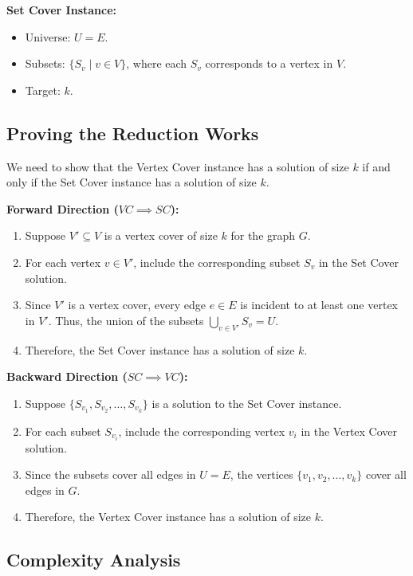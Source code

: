 \documentclass[10pt,letter,notitlepage]{article}
\begin{document}
\begin{Answer}
\textbf{Set Cover Instance:}
\begin{itemize}
    \item Universe: \(U = E\).
    \item Subsets: \(\{S_v \mid v \in V\}\), where each \(S_v\) corresponds to a vertex in \(V\).
    \item Target: \(k\).
\end{itemize}

\subsection*{Proving the Reduction Works}

We need to show that the Vertex Cover instance has a solution of size \(k\) if and only if the Set Cover instance has a solution of size \(k\).

\textbf{Forward Direction (\(VC \implies SC\)):}
\begin{enumerate}
    \item Suppose \(V' \subseteq V\) is a vertex cover of size \(k\) for the graph \(G\).
    \item For each vertex \(v \in V'\), include the corresponding subset \(S_v\) in the Set Cover solution.
    \item Since \(V'\) is a vertex cover, every edge \(e \in E\) is incident to at least one vertex in \(V'\). Thus, the union of the subsets \(\bigcup_{v \in V'} S_v = U\).
    \item Therefore, the Set Cover instance has a solution of size \(k\).
\end{enumerate}

\textbf{Backward Direction (\(SC \implies VC\)):}
\begin{enumerate}
    \item Suppose \(\{S_{v_1}, S_{v_2}, \dots, S_{v_k}\}\) is a solution to the Set Cover instance.
    \item For each subset \(S_{v_i}\), include the corresponding vertex \(v_i\) in the Vertex Cover solution.
    \item Since the subsets cover all edges in \(U = E\), the vertices \(\{v_1, v_2, \dots, v_k\}\) cover all edges in \(G\).
    \item Therefore, the Vertex Cover instance has a solution of size \(k\).
\end{enumerate}

\subsection*{Complexity Analysis}


\end{Answer}
\end{document}
